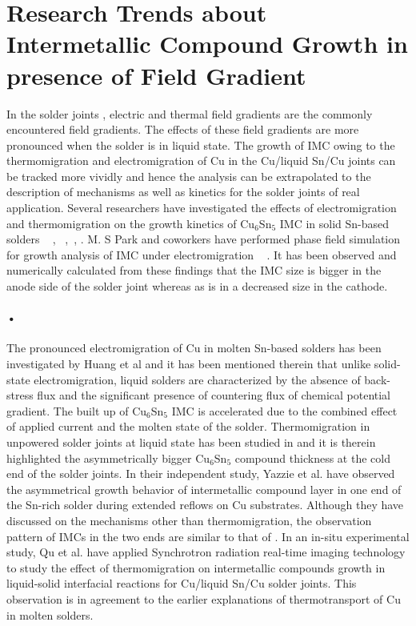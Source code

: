 \section{Research Trends about Intermetallic Compound Growth in presence of Field Gradient}
In the solder joints , electric and thermal field gradients are the commonly encountered field gradients. The effects of these field gradients are more pronounced when the solder is in liquid state. The growth of IMC owing to the thermomigration and electromigration of Cu in the Cu/liquid Sn/Cu joints can be tracked more vividly and hence the analysis can be extrapolated to the description of mechanisms as well as kinetics for the solder joints of real application. Several researchers have investigated the effects of electromigration and thermomigration on the growth kinetics of Cu$_6$Sn$_5$ IMC in solid Sn-based solders ~\cite{BChao2006} \cite{BChao2007}\cite{BChao2009},\cite{TYlee2001}\cite{HGan2002} \cite{HGan2005}\cite{KNtu2007}~\cite{KNtu2011},~\cite{YDlu2009},
\cite{CEho2014}\cite{LChen2010}\cite{MLhuang2012}\cite{LMeinhausen2013}\cite{HYhsiao2009}  \cite{MFAbdulhamid2008}\cite{MFAbdulhamid2009}\cite{ZNing2015}.  M. S Park and coworkers have performed phase field simulation for growth analysis of IMC under electromigration ~\cite{MSpark2013}\cite{AnilHUZHEJIANG05}\cite{RomaKBBK:2000}
\cite{Jennyjessicarenqiao24792} \cite{AZGGH:2002}. It has been observed and numerically calculated from these findings that the IMC size is bigger in the anode side of the solder joint whereas as is in a decreased size in the cathode.
\paragraph*{•} 
The pronounced electromigration of Cu in molten Sn-based solders has been investigated by Huang et al \cite{JRhuang2008} and it has been mentioned therein that unlike solid-state electromigration, liquid solders are characterized by the absence of back-stress flux and the significant presence of countering flux of  chemical potential gradient. The built up of Cu$_6$Sn$_5$ IMC is accelerated due to the combined effect of applied current and the molten state of the solder. Thermomigration in unpowered solder joints at liquid state has been studied in \cite{YMguo2012}\cite{CChen2012} and it is therein highlighted the asymmetrically bigger Cu$_6$Sn$_5$ compound thickness at the cold end of the solder joints. In their independent study, Yazzie et al.\cite{KEyazzie2012} have observed the asymmetrical growth behavior of intermetallic compound layer in one end of the Sn-rich solder during extended reflows on Cu substrates. Although they have discussed on the mechanisms other than thermomigration, the observation pattern of IMCs in the two ends are similar to that of \cite{YMguo2012}\cite{CChen2012}. In an in-situ experimental study, Qu et al. \cite{LQu2014JAP} have applied Synchrotron radiation real-time imaging technology to study the  effect of thermomigration on intermetallic compounds growth in liquid-solid interfacial reactions for Cu/liquid Sn/Cu solder joints. This observation is in agreement to the earlier explanations of thermotransport of Cu in molten solders.  

